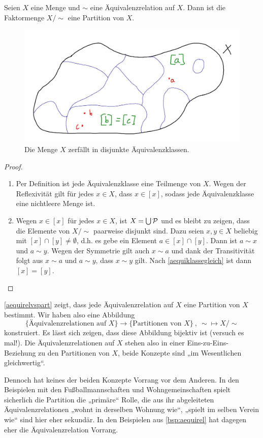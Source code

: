 \begin{satz} \label{aequirelvspart}
    Seien $X$ eine Menge und $\sim$ eine Äquivalenzrelation auf $X$. Dann ist die Faktormenge $X/{\sim}$ eine Partition von $X$.
    \begin{figure}[ht]
        \includegraphics[width=12cm]{./_img/equivalence.jpeg}
        \centering \caption{Die Menge $X$ zerfällt in disjunkte Äquivalenzklassen.}
    \end{figure}
\end{satz}
\begin{proof}
\begin{enumerate}[(P1)]
    \item Per Definition ist jede Äquivalenzklasse eine Teilmenge von $X$. Wegen der Reflexivität gilt für jedes $x\in X$, dass $x\in[x]$, sodass jede Äquivalenzklasse eine nichtleere Menge ist.
    \item Wegen $x\in [x]$ für jedes $x\in X$, ist $X=\bigcup \mathcal P$ und es bleibt zu zeigen, dass die Elemente von $X/{\sim}$ paarweise disjunkt sind. Dazu seien $x,y\in X$ beliebig mit $[x]\cap [y]\neq \emptyset$, d.h. es gebe ein Element $a\in [x]\cap [y]$. Dann ist $a\sim x$ und $a\sim y$. Wegen der Symmetrie gilt auch $x\sim a$ und dank der Transitivität folgt aus $x\sim a$ und $a\sim y$, dass $x\sim y$ gilt. Nach \cref{aequiklassegleich} ist dann $[x]=[y]$. \qedhere
\end{enumerate}
\end{proof}


\begin{bem}
    \cref{aequirelvspart} zeigt, dass jede Äquivalenzrelation auf $X$ eine Partition von $X$ bestimmt. Wir haben also eine Abbildung
        \[ \{ \text{Äquivalenzrelationen auf $X$}\} \to \{ \text{Partitionen von $X$}\} \ ,\ {\sim} \mapsto X/{\sim} \]
    konstruiert. Es lässt sich zeigen, dass diese Abbildung bijektiv ist (versuch es mal!). Die Äquivalenzrelationen auf $X$ stehen also in einer Eins-zu-Eins-Beziehung zu den Partitionen von $X$, beide Konzepte sind „im Wesentlichen gleichwertig“.
    
    Dennoch hat keines der beiden Konzepte Vorrang vor dem Anderen. In den Beispielen mit den Fußballmannschaften und Wohngemeinschaften spielt sicherlich die Partition die „primäre“ Rolle, die aus ihr abgeleiteten Äquivalenzrelationen „wohnt in derselben Wohnung wie“, „spielt im selben Verein wie“ sind hier eher sekundär. In den Beispielen aus \cref{bsp:aequirel} hat dagegen eher die Äquivalenzrelation Vorrang.
\end{bem}





